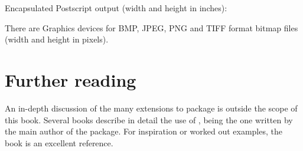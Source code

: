 \documentclass[krantz2]{krantz}\usepackage{knitr}%
\begin{document}
Encapsulated Postscript output (width and height in inches):

\begin{knitrout}\footnotesize
{}\color{fgcolor}\begin{kframe}
\begin{alltt}
\hlstd{(} \hlstd{=} \hlstd{,}  \hlstd{=} \hlstd{,}  \hlstd{=} \hlstd{)}
\hlstd{()}
\end{alltt}
\end{kframe}
\end{knitrout}

There are Graphics devices for BMP, JPEG, PNG and TIFF format bitmap files (width and height in pixels).

\begin{knitrout}\footnotesize
{}\color{fgcolor}\begin{kframe}
\begin{alltt}
\hlstd{(} \hlstd{=} \hlstd{,}  \hlstd{=} \hlstd{,}  \hlstd{=} \hlstd{)}
\hlstd{()}
\end{alltt}
\end{kframe}
\end{knitrout}

\section{Further reading}
An in-depth discussion of the many extensions to package  is outside the scope of this book. Several books describe in detail the use of , being  \autocite{Wickham2016} the one written by the main author of the package. For inspiration or worked out examples, the book  \autocite{Chang2018} is an excellent reference.
\end{document}
